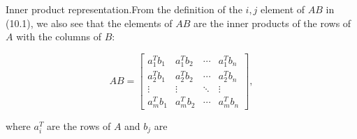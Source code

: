 Inner product representation.From the definition of the \(i,j\) element of \(AB\) in (10.1), we also see that the elements of \(AB\) are the inner products of the rows of \(A\) with the columns of \(B\):

\[AB=\left[\begin{array}{cccc}a_{1}^{T}b_{1}&a_{1}^{T}b_{2}&\cdots&a_{1}^{T}b_{n }\\ a_{2}^{T}b_{1}&a_{2}^{T}b_{2}&\cdots&a_{2}^{T}b_{n}\\ \vdots&\vdots&\ddots&\vdots\\ a_{m}^{T}b_{1}&a_{m}^{T}b_{2}&\cdots&a_{m}^{T}b_{n}\end{array}\right],\]

where \(a_{i}^{T}\) are the rows of \(A\) and \(b_{j}\) are 
